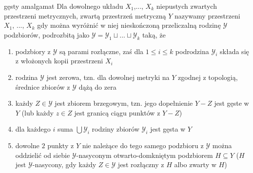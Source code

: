 \begin{definition}{gęsty amalgamat}{}
  Dla dowolnego układu $X_1$,..., $X_k$ niepustych zwartych przestrzeni metrycznych, zwartą przestrzeń metryczną $Y$ nazywamy  przestrzeni $X_1$, ..., $X_k$ gdy można wyróżnić w niej nieskończoną przeliczalną rodzinę $\mathcal{Y}$ podzbiorów, podrozbitą jako $\mathcal{Y}=\mathcal{Y}_1\sqcup ...\sqcup \mathcal{Y}_k$ taką, że 
  \begin{enumerate}
    \item podzbiory z $\mathcal{Y}$ są parami rozłączne, zaś dla $1\leq i\leq k$ podrodzina $\mathcal{Y}_i$ składa się z włożonych kopii przestrzeni $X_i$
    \item rodzina $\mathcal{Y}$ jest zerowa, tzn. dla dowolnej metryki na $Y$ zgodnej z topologią, średnice zbiorów z $\mathcal{Y}$ dążą do zera
    \item każdy $Z\in\mathcal{Y}$ jest zbiorem brzegowym, tzn. jego dopełnienie $Y-Z$ jest gęste w $Y$ (lub każdy $z\in Z$ jest granicą ciągu punktów z $Y-Z$)
    \item dla każdego $i$ suma $\bigcup \mathcal{Y}_i$ rodziny zbiorów $\mathcal{Y}_i$ jest gęsta w $Y$
    \item dowolne $2$ punkty z $Y$ nie należące do tego samego podzbioru z $\mathcal{Y}$ można oddzielić od siebie $\mathcal{Y}$-nasyconym otwarto-domkniętym podzbiorem $H\subseteq Y$ ($H$ jest $\mathcal{Y}$-nasycony, gdy każdy $Z\in\mathcal{Y}$ jest rozłączny z $H$ albo zwarty w $H$)
  \end{enumerate}
\end{definition}











